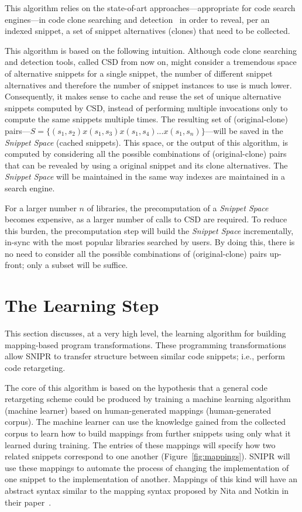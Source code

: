 This algorithm relies on the state-of-art approaches---appropriate for code search engines---in code clone searching and detection~\cite{Jiang:2007cj, Roh:2010ts} in order to reveal, per an indexed snippet, a set of snippet alternatives (clones) that need to be collected.

This algorithm is based on the following intuition. Although code clone searching and detection tools, called CSD from now on, might consider a tremendous space of alternative snippets for a single snippet, the number of different snippet alternatives and therefore the number of snippet instances to use is much lower. Consequently, it makes sense to cache and reuse the set of unique alternative snippets computed by CSD, instead of performing multiple invocations only to compute the same snippets multiple times. The resulting set of (original-clone) pairs---$S = \{(s_1, s_2) x (s_1, s_3) x (s_1, s_4) ... x (s_1, s_n)\}$---will be saved in the \emph{Snippet Space} (cached snippets). This space, or the output of this algorithm, is computed by considering all the possible combinations of (original-clone) pairs that can be revealed by using a original snippet and its clone alternatives. The \emph{Snippet Space} will be maintained in the same way indexes are maintained in a search engine.

For a larger number $n$ of libraries, the precomputation of a \emph{Snippet Space} becomes expensive, as a larger number of calls to CSD are required. To reduce this burden, the precomputation step will build the \emph{Snippet Space} incrementally, in-sync with the most popular libraries searched by users. By doing this, there is no need to consider all the possible combinations of (original-clone) pairs up-front; only a subset will be suffice.

\section{The Learning Step}
\label{sec:learning}

This section discusses, at a very high level, the learning algorithm for building mapping-based program transformations. These programming transformations allow \uppercase{SnipR} to transfer structure between similar code snippets; i.e., perform code retargeting.

The core of this algorithm is based on the hypothesis that a general code retargeting scheme could be produced by training a machine learning algorithm (machine learner) based on human-generated mappings (human-generated corpus). The machine learner can use the knowledge gained from the collected corpus to learn how to build mappings from further snippets using only what it learned during training. The entries of these mappings will specify how two related snippets correspond to one another (Figure~\ref{fig:mappings}). SNIPR will use these mappings to automate the process of changing the implementation of one snippet to the implementation of another. Mappings of this kind will have an abstract syntax similar to the mapping syntax proposed by Nita and Notkin in their paper~\cite{Nita:2010en}.

